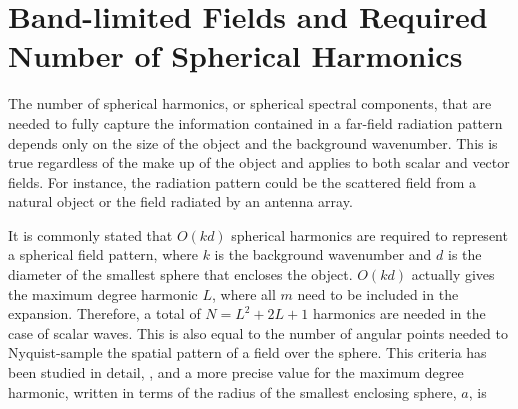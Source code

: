 {\footnotesize
{}
}


%
%
%



\section{Band-limited Fields and Required Number of Spherical Harmonics}

The number of spherical harmonics, or spherical spectral components, that are needed to fully capture the information contained in a far-field radiation pattern depends only on the size of the object and the background wavenumber. This is true regardless of the make up of the object and applies to both scalar and vector fields. For instance, the radiation pattern could be the scattered field from a natural object or the field radiated by an antenna array. 

It is commonly stated that $O(kd)$ spherical harmonics are required to represent a spherical field pattern, where $k$ is the background wavenumber and $d$ is the diameter of the smallest sphere that encloses the object. $O(kd)$ actually gives the maximum degree harmonic $L$, where all $m$ need to be included in the expansion. Therefore, a total of $N = L^2 + 2L + 1$ harmonics are needed in the case of scalar waves. This is also equal to the number of angular points needed to Nyquist-sample the spatial pattern of a field over the sphere. This criteria has been studied in detail, \cite{yaghjian1996sampling}, and a more precise value for the maximum degree harmonic, written in terms of the radius of the smallest enclosing sphere, $a$, is 

